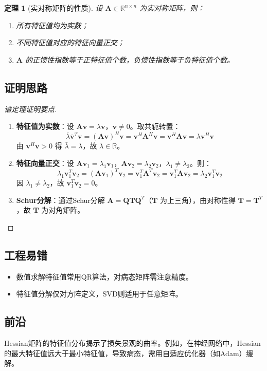 \documentclass[UTF8, 10pt]{ctexart}
\newtheorem{theorem}{定理}[section]
\newcommand{\R}{\mathbb{R}}
\begin{document}
\begin{theorem}[实对称矩阵的性质]
设 $\bm{A} \in \R^{n \times n}$ 为实对称矩阵，则：
\begin{enumerate}
    \item 所有特征值均为实数；
    \item 不同特征值对应的特征向量正交；
    \item $\bm{A}$ 的正惯性指数等于正特征值个数，负惯性指数等于负特征值个数。
\end{enumerate}
\end{theorem}

\subsection{证明思路}
\begin{proof}[谱定理证明要点]
\begin{enumerate}
    \item \textbf{特征值为实数}：设 $\bm{A}\bm{v} = \lambda \bm{v}$，$\bm{v} \neq 0$。取共轭转置：
    \[
    \bar{\lambda}\bar{\bm{v}}^T\bm{v} = (\bm{A}\bm{v})^H \bm{v} = \bm{v}^H \bm{A}^H \bm{v} = \bm{v}^H \bm{A} \bm{v} = \lambda \bm{v}^H \bm{v}
    \]
    由 $\bm{v}^H \bm{v} > 0$ 得 $\bar{\lambda} = \lambda$，故 $\lambda \in \R$。
    \item \textbf{特征向量正交}：设 $\bm{A}\bm{v}_1 = \lambda_1 \bm{v}_1$，$\bm{A}\bm{v}_2 = \lambda_2 \bm{v}_2$，$\lambda_1 \neq \lambda_2$。则：
    \[
    \lambda_1 \bm{v}_1^T \bm{v}_2 = (\bm{A}\bm{v}_1)^T \bm{v}_2 = \bm{v}_1^T \bm{A}^T \bm{v}_2 = \bm{v}_1^T \bm{A} \bm{v}_2 = \lambda_2 \bm{v}_1^T \bm{v}_2
    \]
    因 $\lambda_1 \neq \lambda_2$，故 $\bm{v}_1^T \bm{v}_2 = 0$。
    \item \textbf{Schur分解}：通过Schur分解 $\bm{A} = \bm{Q} \bm{T} \bm{Q}^T$（$\bm{T}$ 为上三角），由对称性得 $\bm{T} = \bm{T}^T$，故 $\bm{T}$ 为对角矩阵。
\end{enumerate}
\end{proof}

\subsection{工程易错}
\begin{itemize}
    \item 数值求解特征值常用QR算法，对病态矩阵需注意精度。
    \item 特征值分解仅对方阵定义，SVD则适用于任意矩阵。
\end{itemize}

\subsection{前沿}
Hessian矩阵的特征值分布揭示了损失景观的曲率。例如，在神经网络中，Hessian的最大特征值远大于最小特征值，导致病态，需用自适应优化器（如Adam）缓解。
\end{document}
